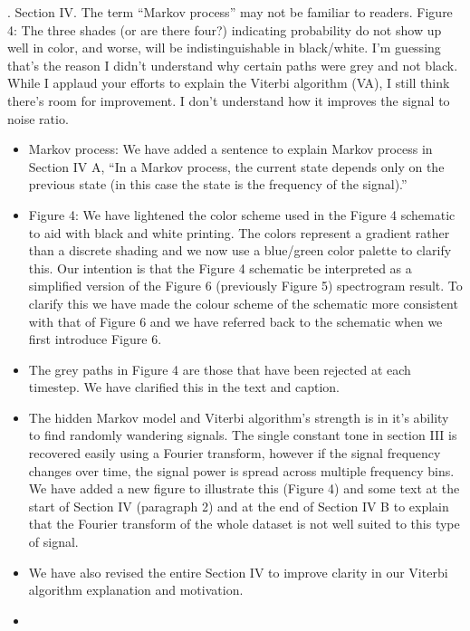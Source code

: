 \documentclass{article}
\begin{document}
. Section IV.  The term “Markov process” may not be familiar to readers.  Figure 4: The three shades (or are there four?) indicating probability do not show up well in color, and worse, will be indistinguishable in black/white.  I’m guessing that’s the reason I didn’t understand why certain paths were grey and not black.  While I applaud your efforts to explain the Viterbi algorithm (VA), I still think there’s room for improvement.  I don’t understand how it improves the signal to noise ratio. 
\begin{itemize}
\item Markov process: We have added a sentence to explain Markov process in Section IV A, ``In a Markov process, the current state depends only on the previous state (in this case the state is the frequency of the signal).''
\item Figure 4: We have lightened the color scheme used in the Figure 4 schematic to aid with black and white printing. The colors represent a gradient rather than a discrete shading and we now use a blue/green color palette to clarify this. Our intention is that the Figure 4 schematic be interpreted as a simplified version of the Figure 6 (previously Figure 5) spectrogram result. To clarify this we have made the colour scheme of the schematic more consistent with that of Figure 6 and we have referred back to the schematic when we first introduce Figure 6. 
\item The grey paths in Figure 4 are those that have been rejected at each timestep. We have clarified this in the text and caption. 
\item The hidden Markov model and Viterbi algorithm's strength is in it's ability to find randomly wandering signals. The single constant tone in section III is recovered easily using a Fourier transform, however if the signal frequency changes over time, the signal power is spread across multiple frequency bins. We have added a new figure to illustrate this (Figure 4) and some text at the start of Section IV (paragraph 2) and at the end of Section IV B to explain that the Fourier transform of the whole dataset is not well suited to this type of signal.
\item We have also revised the entire Section IV to improve clarity in our Viterbi algorithm explanation and motivation.
\item[]
\end{itemize}
\end{document}
